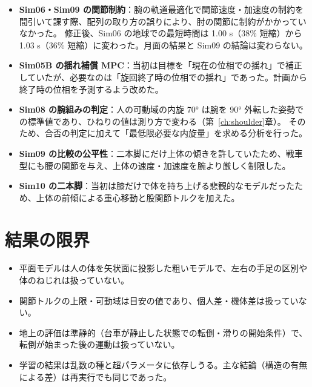 \begin{itemize}
\item \textbf{Sim06・Sim09 の関節制約}：腕の軌道最適化で関節速度・加速度の制約を間引いて課す際、配列の取り方の誤りにより、肘の関節に制約がかかっていなかった。
  修正後、Sim06 の地球での最短時間は 1.00 s（38\% 短縮）から 1.03 s（36\% 短縮）に変わった。月面の結果と Sim09 の結論は変わらない。
\item \textbf{Sim05B の揺れ補償 MPC}：当初は目標を「現在の位相での揺れ」で補正していたが、必要なのは「旋回終了時の位相での揺れ」であった。計画から終了時の位相を予測するよう改めた。
\item \textbf{Sim08 の腕組みの判定}：人の可動域の内旋 70° は腕を 90° 外転した姿勢での標準値であり、ひねりの値は測り方で変わる（第~\ref{ch:shoulder}章）。
  そのため、合否の判定に加えて「最低限必要な内旋量」を求める分析を行った。
\item \textbf{Sim09 の比較の公平性}：二本脚にだけ上体の傾きを許していたため、戦車型にも腰の関節を与え、上体の速度・加速度を腕より厳しく制限した。
\item \textbf{Sim10 の二本脚}：当初は膝だけで体を持ち上げる悲観的なモデルだったため、上体の前傾による重心移動と股関節トルクを加えた。
\end{itemize}

\section{結果の限界}

\begin{itemize}
\item 平面モデルは人の体を矢状面に投影した粗いモデルで、左右の手足の区別や体のねじれは扱っていない。
\item 関節トルクの上限・可動域は目安の値であり、個人差・機体差は扱っていない。
\item 地上の評価は準静的（台車が静止した状態での転倒・滑りの開始条件）で、転倒が始まった後の運動は扱っていない。
\item 学習の結果は乱数の種と超パラメータに依存しうる。主な結論（構造の有無による差）は再実行でも同じであった。
\end{itemize}
